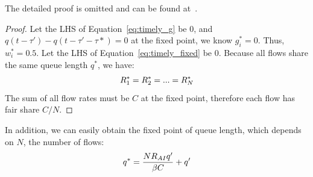 The detailed proof is omitted and can be found at~\cite{fullpaper}.



\begin{proof}
Let the LHS of Equation~\ref{eq:timely_g} be 0, and $q(t - \tau ') - q(t - \tau ' - \tau *) = 0$ at the fixed 
point, we know $g_i^*=0$. Thus, $w_i^*=0.5$. Let the LHS of Equation~\ref{eq:timely_fixed} be 0. Because
all flows share the same queue length $q^*$, we have:
\begin{equation}
\small
R_1^* = R_2^* = ... = R_N^*
\end{equation}
The sum of all flow rates must be $C$ at the fixed point, therefore each flow has fair share $C/N$. 
\end{proof}
In addition, we can easily obtain the fixed point of queue length, which depends on $N$, the number of flows:
\begin{equation}
\small
{q^*} = \frac{{N{R_{AI}}q'}}{{\beta C}} + q'
\label{eq:timely_fixed_q}
\end{equation}

